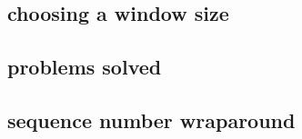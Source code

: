 \subsection{choosing a window size}





\subsection{problems solved}


\subsection{sequence number wraparound}


